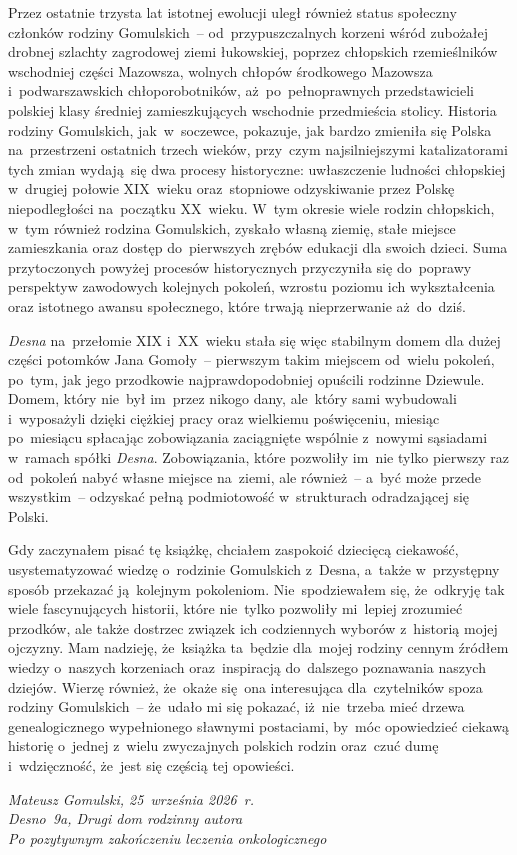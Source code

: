 Przez ostatnie trzysta lat istotnej ewolucji uległ również status społeczny
członków rodziny Gomulskich~-- od~przypuszczalnych korzeni wśród zubożałej
drobnej szlachty zagrodowej ziemi łukowskiej, poprzez chłopskich rzemieślników
wschodniej części Mazowsza, wolnych chłopów środkowego Mazowsza
i~podwarszawskich chłoporobotników, aż~po~pełnoprawnych przedstawicieli
polskiej klasy średniej zamieszkujących wschodnie przedmieścia stolicy.
Historia rodziny Gomulskich, jak~w~soczewce, pokazuje, jak bardzo zmieniła się
Polska na~przestrzeni ostatnich trzech wieków, przy~czym najsilniejszymi
katalizatorami tych zmian wydają~się dwa procesy historyczne: uwłaszczenie
ludności chłopskiej w~drugiej połowie XIX~wieku oraz~stopniowe odzyskiwanie
przez Polskę niepodległości na~początku XX~wieku. W~tym okresie wiele rodzin
chłopskich, w~tym również rodzina Gomulskich, zyskało własną ziemię, stałe
miejsce zamieszkania oraz dostęp do~pierwszych zrębów edukacji dla swoich
dzieci. Suma przytoczonych powyżej procesów historycznych przyczyniła się
do~poprawy perspektyw zawodowych kolejnych pokoleń, wzrostu poziomu ich
wykształcenia oraz istotnego awansu społecznego, które trwają nieprzerwanie
aż~do~dziś.

\emph{Desna} na~przełomie XIX i~XX~wieku stała się więc stabilnym domem dla
dużej części potomków Jana Gomoły~-- pierwszym takim miejscem od~wielu
pokoleń, po~tym, jak jego przodkowie najprawdopodobniej opuścili rodzinne
Dziewule. Domem, który nie~był im~przez nikogo dany, ale~który sami wybudowali
i~wyposażyli dzięki ciężkiej pracy oraz wielkiemu poświęceniu, miesiąc
po~miesiącu spłacając zobowiązania zaciągnięte wspólnie z~nowymi sąsiadami
w~ramach spółki \emph{Desna}. Zobowiązania, które pozwoliły im~nie tylko
pierwszy raz od~pokoleń nabyć własne miejsce na~ziemi, ale również~-- a~być
może przede wszystkim~-- odzyskać pełną podmiotowość w~strukturach
odradzającej się Polski.

Gdy zaczynałem pisać tę książkę, chciałem zaspokoić dziecięcą ciekawość,
usystematyzować wiedzę o~rodzinie Gomulskich z~Desna, a~także w~przystępny
sposób przekazać ją~kolejnym pokoleniom. Nie~spodziewałem się, że~odkryję tak
wiele fascynujących historii, które nie~tylko pozwoliły mi~lepiej zrozumieć
przodków, ale także dostrzec związek ich codziennych wyborów z~historią mojej
ojczyzny. Mam nadzieję, że~książka ta~będzie dla~mojej rodziny cennym źródłem
wiedzy o~naszych korzeniach oraz~inspiracją do~dalszego poznawania naszych
dziejów. Wierzę również, że~okaże się~ona interesująca dla~czytelników spoza
rodziny Gomulskich~-- że~udało mi się pokazać, iż~nie~trzeba mieć drzewa
genealogicznego wypełnionego sławnymi postaciami, by~móc opowiedzieć ciekawą
historię o~jednej z~wielu zwyczajnych polskich rodzin oraz~czuć dumę
i~wdzięczność, że~jest się częścią tej opowieści. \\

\begin{flushright}
\emph{Mateusz Gomulski, 25~września 2026~r.} \\
\emph{Desno~9a, Drugi dom rodzinny autora} \\
\emph{Po pozytywnym zakończeniu leczenia onkologicznego} 
\end{flushright}